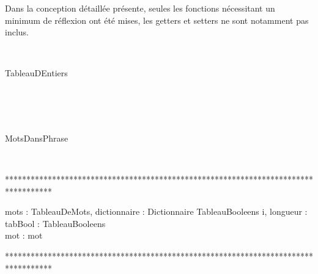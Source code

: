 \par Dans la conception d\'etaill\'ee pr\'esente, seules les fonctions n\'ecessitant un minimum de r\'eflexion ont \'et\'e mises, les getters et setters ne sont notamment pas inclus.\\


\begin{algorithme}

\\

\begin{enregistrement}{TableauDEntiers}
\end{enregistrement}\\

\\

\\

\begin{enregistrement}{MotsDansPhrase}
\end{enregistrement}\\

\end{algorithme}

***********************************************************************************

\begin{algorithme}
%
	{mots : TableauDeMots, dictionnaire : Dictionnaire}%
	{TableauBooleens}%
	{i, longueur : \naturel \\ tabBool : TableauBooleens\\ mot : mot}%
	{%
	{	
		{
		}%
		{
			}
	}%
	}\\
\end{algorithme}
	
***********************************************************************************

